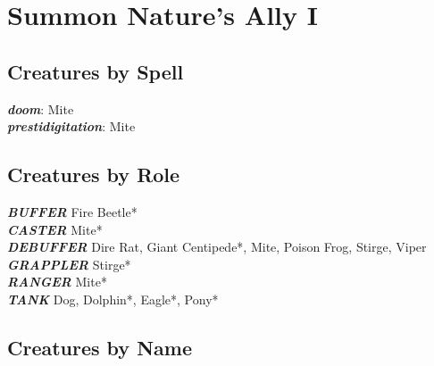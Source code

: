 \newpage

\def \levelnnumsummons{1}

\chapter{Summon Nature's Ally I}
\newpage

\section{Creatures by Spell}

\vspace{5pt}

\textbf{\textit{doom}}: Mite \\
\textbf{\textit{prestidigitation}}: Mite \\

\newpage

\section{Creatures by Role}

\vspace{5pt}

\textbf{\textit{BUFFER}} Fire Beetle* \\

\textbf{\textit{CASTER}} Mite* \\

\textbf{\textit{DEBUFFER}} Dire Rat, Giant Centipede*, Mite, Poison Frog, Stirge, Viper \\

\textbf{\textit{GRAPPLER}} Stirge* \\

\textbf{\textit{RANGER}} Mite* \\

\textbf{\textit{TANK}} Dog, Dolphin*, Eagle*, Pony* \\

\newpage

\section{Creatures by Name} 












